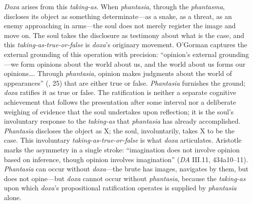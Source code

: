 \documentclass{article}
\begin{document}
\textit{Doxa} arises from this \textit{taking-as}. When \textit{phantasia}, through the \textit{phantasma}, discloses its object as something determinate---as a snake, as a threat, as an enemy approaching in arms---the soul does not merely register the image and move on. The soul takes the disclosure as testimony about what is the case, and this \textit{taking-as-true-or-false} is \textit{doxa}'s originary movement. O'Gorman captures the external grounding of this operation with precision: ``opinion's external grounding---we form opinions about the world about us, and the world about us forms our opinions\ldots. Through \textit{phantasia}, opinion makes judgments about the world of appearances'' (\cite{ogorman_aristotles_phantasia}, 25) that are either true or false. \textit{Phantasia} furnishes the ground; \textit{doxa} ratifies it as true or false. The ratification is neither a separate cognitive achievement that follows the presentation after some interval nor a deliberate weighing of evidence that the soul undertakes upon reflection; it is the soul's involuntary response to the \textit{taking-as} that \textit{phantasia} has already accomplished. \textit{Phantasia} discloses the object as X; the soul, involuntarily, takes X to be the case. This involuntary \textit{taking-as-true-or-false} is what \textit{doxa} articulates. Aristotle marks the asymmetry in a single stroke: ``imagination does not involve opinion based on inference, though opinion involves imagination'' (\textit{DA} III.11, 434a10--11). \textit{Phantasia} can occur without \textit{doxa}---the brute has images, navigates by them, but does not opine---but \textit{doxa} cannot occur without \textit{phantasia}, because the \textit{taking-as} upon which \textit{doxa}'s propositional ratification operates is supplied by \textit{phantasia} alone.
\end{document}
